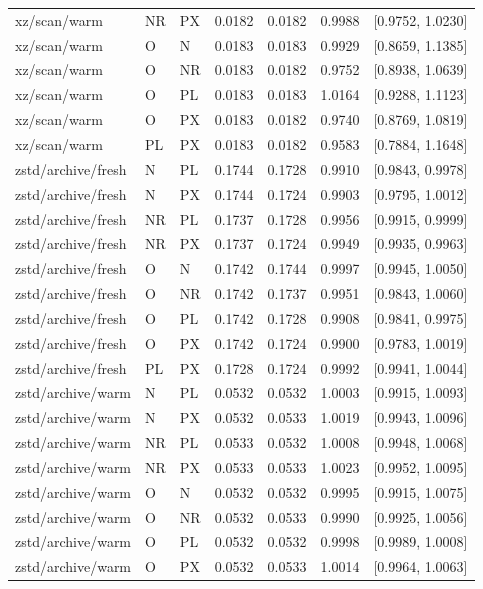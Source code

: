 \begin{longtable}{lllrrrr}
xz/scan/warm & NR & PX & 0.0182 & 0.0182 & 0.9988 & [0.9752, 1.0230] \\
xz/scan/warm & O & N & 0.0183 & 0.0183 & 0.9929 & [0.8659, 1.1385] \\
xz/scan/warm & O & NR & 0.0183 & 0.0182 & 0.9752 & [0.8938, 1.0639] \\
xz/scan/warm & O & PL & 0.0183 & 0.0183 & 1.0164 & [0.9288, 1.1123] \\
xz/scan/warm & O & PX & 0.0183 & 0.0182 & 0.9740 & [0.8769, 1.0819] \\
xz/scan/warm & PL & PX & 0.0183 & 0.0182 & 0.9583 & [0.7884, 1.1648] \\
zstd/archive/fresh & N & PL & 0.1744 & 0.1728 & 0.9910 & [0.9843, 0.9978] \\
zstd/archive/fresh & N & PX & 0.1744 & 0.1724 & 0.9903 & [0.9795, 1.0012] \\
zstd/archive/fresh & NR & PL & 0.1737 & 0.1728 & 0.9956 & [0.9915, 0.9999] \\
zstd/archive/fresh & NR & PX & 0.1737 & 0.1724 & 0.9949 & [0.9935, 0.9963] \\
zstd/archive/fresh & O & N & 0.1742 & 0.1744 & 0.9997 & [0.9945, 1.0050] \\
zstd/archive/fresh & O & NR & 0.1742 & 0.1737 & 0.9951 & [0.9843, 1.0060] \\
zstd/archive/fresh & O & PL & 0.1742 & 0.1728 & 0.9908 & [0.9841, 0.9975] \\
zstd/archive/fresh & O & PX & 0.1742 & 0.1724 & 0.9900 & [0.9783, 1.0019] \\
zstd/archive/fresh & PL & PX & 0.1728 & 0.1724 & 0.9992 & [0.9941, 1.0044] \\
zstd/archive/warm & N & PL & 0.0532 & 0.0532 & 1.0003 & [0.9915, 1.0093] \\
zstd/archive/warm & N & PX & 0.0532 & 0.0533 & 1.0019 & [0.9943, 1.0096] \\
zstd/archive/warm & NR & PL & 0.0533 & 0.0532 & 1.0008 & [0.9948, 1.0068] \\
zstd/archive/warm & NR & PX & 0.0533 & 0.0533 & 1.0023 & [0.9952, 1.0095] \\
zstd/archive/warm & O & N & 0.0532 & 0.0532 & 0.9995 & [0.9915, 1.0075] \\
zstd/archive/warm & O & NR & 0.0532 & 0.0533 & 0.9990 & [0.9925, 1.0056] \\
zstd/archive/warm & O & PL & 0.0532 & 0.0532 & 0.9998 & [0.9989, 1.0008] \\
zstd/archive/warm & O & PX & 0.0532 & 0.0533 & 1.0014 & [0.9964, 1.0063] \\

\end{longtable}
